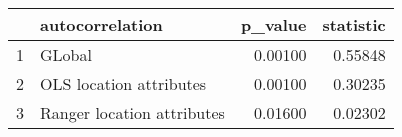 \begin{table}[ht]
\centering
\begin{tabular}{rlrr}
  \hline
 & autocorrelation & p\_value & statistic \\ 
  \hline
1 & GLobal & 0.00100 & 0.55848 \\ 
  2 & OLS location attributes & 0.00100 & 0.30235 \\ 
  3 & Ranger location attributes & 0.01600 & 0.02302 \\ 
   \hline
\end{tabular}
\end{table}
